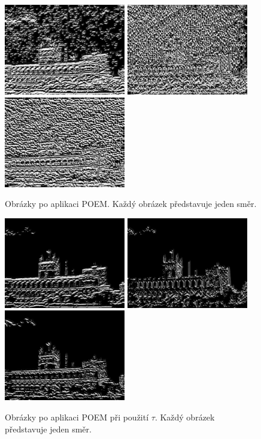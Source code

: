 \documentclass{report}
\begin{document}
\begin{figure}[H]
	\centering
	\includegraphics[width=150pt]{./img/lbp0.jpg}
	\includegraphics[width=150pt]{./img/lbp1.jpg}
	\includegraphics[width=150pt]{./img/lbp2.jpg}
	\caption{Obrázky po aplikaci POEM. Každý obrázek představuje jeden směr.}
\end{figure}

\begin{figure}[H]
	\centering
	\includegraphics[width=150pt]{./img/lbp0_tau.jpg}
	\includegraphics[width=150pt]{./img/lbp1_tau.jpg}
	\includegraphics[width=150pt]{./img/lbp2_tau.jpg}
	\caption{Obrázky po aplikaci POEM při použití $\tau$. Každý obrázek představuje jeden směr.}
\end{figure} 
\end{document}
